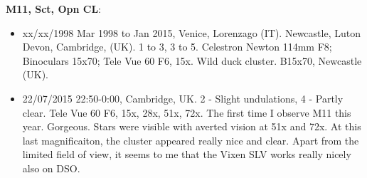 {\bf M11, Sct, Opn CL}:
\begin{itemize}
\item xx/xx/1998 Mar 1998 to Jan 2015, Venice, Lorenzago (IT). Newcastle, Luton Devon, Cambridge, (UK). 1 to 3, 3 to 5. Celestron Newton 114mm F8; Binoculars 15x70; Tele Vue 60 F6, 15x. Wild duck cluster. B15x70, Newcastle (UK).
\item 22/07/2015 22:50-0:00, Cambridge, UK. 2 - Slight undulations, 4 - Partly clear. Tele Vue 60 F6, 15x, 28x, 51x, 72x. The first time I observe M11 this year. Gorgeous. Stars were visible with averted vision at 51x and 72x. At this last magnificaiton, the cluster appeared really nice and clear. Apart from the limited field of view, it seems to me that the Vixen SLV works really nicely also on DSO.
\end{itemize}
